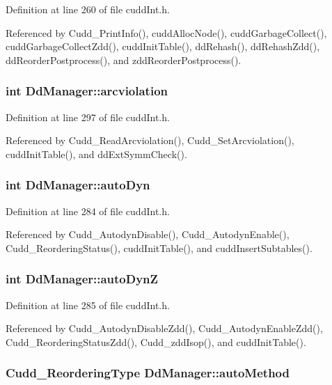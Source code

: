 Definition at line 260 of file cudd\-Int.h.

Referenced by Cudd\_\-Print\-Info(), cudd\-Alloc\-Node(), cudd\-Garbage\-Collect(), cudd\-Garbage\-Collect\-Zdd(), cudd\-Init\-Table(), dd\-Rehash(), dd\-Rehash\-Zdd(), dd\-Reorder\-Postprocess(), and zdd\-Reorder\-Postprocess().
\subsubsection{\setlength{\rightskip}{0pt plus 5cm}int \bf{Dd\-Manager::arcviolation}}\label{structDdManager_a0b71843baf33ac9815c7bddeb327aa6}




Definition at line 297 of file cudd\-Int.h.

Referenced by Cudd\_\-Read\-Arcviolation(), Cudd\_\-Set\-Arcviolation(), cudd\-Init\-Table(), and dd\-Ext\-Symm\-Check().
\subsubsection{\setlength{\rightskip}{0pt plus 5cm}int \bf{Dd\-Manager::auto\-Dyn}}\label{structDdManager_9136059080410a9d0b71fc63183a7879}




Definition at line 284 of file cudd\-Int.h.

Referenced by Cudd\_\-Autodyn\-Disable(), Cudd\_\-Autodyn\-Enable(), Cudd\_\-Reordering\-Status(), cudd\-Init\-Table(), and cudd\-Insert\-Subtables().
\subsubsection{\setlength{\rightskip}{0pt plus 5cm}int \bf{Dd\-Manager::auto\-Dyn\-Z}}\label{structDdManager_c06486dc138c5f80434aa2d9f47ce892}




Definition at line 285 of file cudd\-Int.h.

Referenced by Cudd\_\-Autodyn\-Disable\-Zdd(), Cudd\_\-Autodyn\-Enable\-Zdd(), Cudd\_\-Reordering\-Status\-Zdd(), Cudd\_\-zdd\-Isop(), and cudd\-Init\-Table().
\subsubsection{\setlength{\rightskip}{0pt plus 5cm}\bf{Cudd\_\-Reordering\-Type} \bf{Dd\-Manager::auto\-Method}}\label{structDdManager_20124711be407362dbe378648906ef89}




